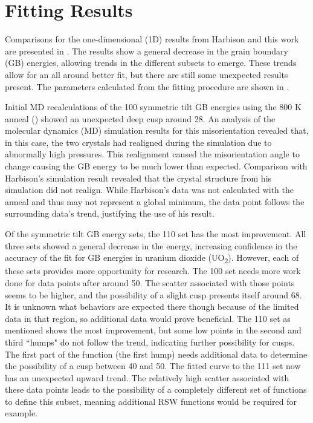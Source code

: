 \documentclass[twoside,senior]{BYUPhys}
\begin{document}
\section{Fitting Results\label{results:fit}}
Comparisons for the one-dimensional (1D) results from Harbison\cite{harbison2015} and this work are presented in .  The results show a general decrease in the grain boundary (GB) energies, allowing trends in the different subsets to emerge.  These trends allow for an all around better fit, but there are still some unexpected results present.  The parameters calculated from the fitting procedure are shown in .

Initial MD recalculations of the \textlangle{}100\textrangle{} symmetric tilt GB energies using the 800 K anneal () showed an unexpected deep cusp around 28\textdegree{}.  An analysis of the molecular dynamics (MD) simulation results for this misorientation revealed that, in this case, the two crystals had realigned during the simulation due to abnormally high pressures.  This realignment caused the misorientation angle to change causing the GB energy to be much lower than expected.  Comparison with Harbison's simulation result revealed that the crystal structure from his simulation did not realign.  While Harbison's data was not calculated with the anneal and thus may not represent a global minimum, the data point follows the surrounding data's trend, justifying the use of his result.

Of the symmetric tilt GB energy sets, the \textlangle{}110\textrangle{} set has the most improvement.  All three sets showed a general decrease in the energy, increasing confidence in the accuracy of the fit for GB energies in uranium dioxide (UO\textsubscript{2}).  However, each of these sets provides more opportunity for research.  The \textlangle{}100\textrangle{} set needs more work done for data points after around 50\textdegree{}.  The scatter associated with those points seems to be higher, and the possibility of a slight cusp presents itself around 68\textdegree{}.  It is unknown what behaviors are expected there though because of the limited data in that region, so additional data would prove beneficial.  The \textlangle{}110\textrangle{} set as mentioned shows the most improvement, but some low points in the second and third ``humps" do not follow the trend, indicating further possibility for cusps.  The first part of the function (the first hump) needs additional data to determine the possibility of a cusp between 40\textdegree{} and 50\textdegree{}.  The fitted curve to the \textlangle{}111\textrangle{} set now has an unexpected upward trend.  The relatively high scatter associated with these data points leads to the possibility of a completely different set of functions to define this subset, meaning additional RSW functions would be required for example.
\end{document}
